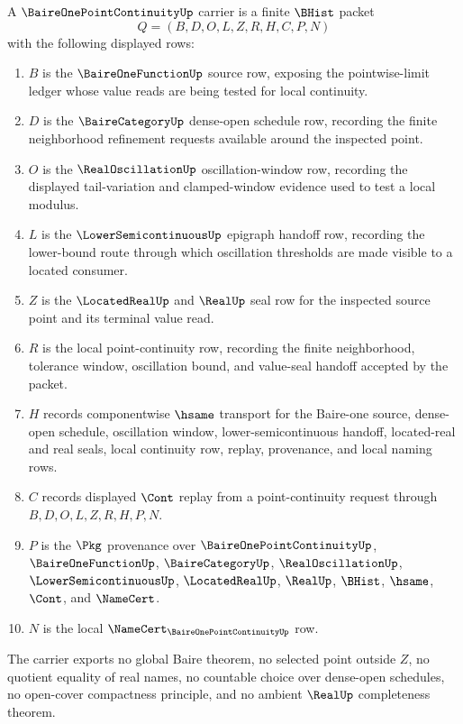 \begin{definition}
\label{def:baire-one-point-continuity-carrier}
A $\BaireOnePointContinuityUp$ carrier is a finite $\BHist$ packet
$$
Q=(B,D,O,L,Z,R,H,C,P,N)
$$
with the following displayed rows:
\begin{enumerate}
\item $B$ is the $\BaireOneFunctionUp$ source row, exposing the pointwise-limit ledger whose value reads are being tested for local continuity.
\item $D$ is the $\BaireCategoryUp$ dense-open schedule row, recording the finite neighborhood refinement requests available around the inspected point.
\item $O$ is the $\RealOscillationUp$ oscillation-window row, recording the displayed tail-variation and clamped-window evidence used to test a local modulus.
\item $L$ is the $\LowerSemicontinuousUp$ epigraph handoff row, recording the lower-bound route through which oscillation thresholds are made visible to a located consumer.
\item $Z$ is the $\LocatedRealUp$ and $\RealUp$ seal row for the inspected source point and its terminal value read.
\item $R$ is the local point-continuity row, recording the finite neighborhood, tolerance window, oscillation bound, and value-seal handoff accepted by the packet.
\item $H$ records componentwise $\hsame$ transport for the Baire-one source, dense-open schedule, oscillation window, lower-semicontinuous handoff, located-real and real seals, local continuity row, replay, provenance, and local naming rows.
\item $C$ records displayed $\Cont$ replay from a point-continuity request through $B,D,O,L,Z,R,H,P,N$.
\item $P$ is the $\Pkg$ provenance over $\BaireOnePointContinuityUp$, $\BaireOneFunctionUp$, $\BaireCategoryUp$, $\RealOscillationUp$, $\LowerSemicontinuousUp$, $\LocatedRealUp$, $\RealUp$, $\BHist$, $\hsame$, $\Cont$, and $\NameCert$.
\item $N$ is the local $\NameCert_{\BaireOnePointContinuityUp}$ row.
\end{enumerate}
The carrier exports no global Baire theorem, no selected point outside $Z$, no quotient equality of real names, no countable choice over dense-open schedules, no open-cover compactness principle, and no ambient $\RealUp$ completeness theorem.
\end{definition}

